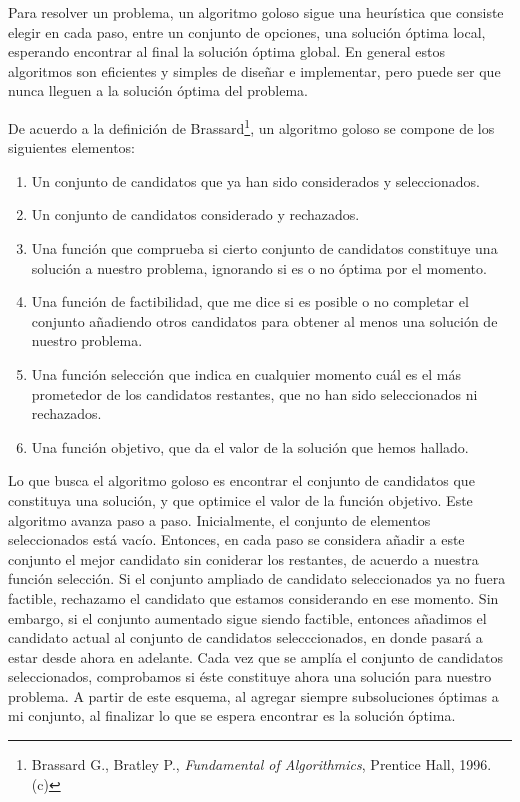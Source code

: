 
Para resolver un problema, un algoritmo goloso sigue una heur\'istica que consiste elegir en cada paso, entre un conjunto de opciones, una soluci\'on \'optima local, esperando encontrar al final la soluci\'on \'optima global. En general estos algoritmos son eficientes y simples de dise\~nar e implementar, pero puede ser que nunca lleguen a la soluci\'on \'optima del problema. 

De acuerdo a la definici\'on de Brassard\footnote{\label{Brassard}Brassard G., Bratley P., {\it Fundamental of Algorithmics}, Prentice Hall, 1996. (c)}, un algoritmo goloso se compone de los siguientes elementos: 

\begin{enumerate}
 \item Un conjunto de candidatos que ya han sido considerados y seleccionados. 
 \item Un conjunto de candidatos considerado y rechazados. 
 \item Una funci\'on que comprueba si cierto conjunto de candidatos constituye una soluci\'on a nuestro problema, ignorando si es o no \'optima por el momento. 
 \item Una funci\'on de factibilidad, que me dice si es posible o no completar el conjunto a\~nadiendo otros candidatos para obtener al menos una soluci\'on de nuestro problema. 
 \item Una funci\'on selecci\'on que indica en cualquier momento cu\'al es el m\'as prometedor de los candidatos restantes, que no han sido seleccionados ni rechazados. 
 \item Una funci\'on objetivo, que da el valor de la soluci\'on que hemos hallado. 
\end{enumerate}

Lo que busca el algoritmo goloso es encontrar el conjunto de candidatos que constituya una soluci\'on, y que optimice el valor de la funci\'on objetivo. Este algoritmo avanza paso a paso. Inicialmente, el conjunto de elementos seleccionados est\'a vac\'io. Entonces, en cada paso se considera a\~nadir a este conjunto el mejor candidato sin coniderar los restantes, de acuerdo a nuestra funci\'on selecci\'on. Si el conjunto ampliado de candidato seleccionados ya no fuera factible, rechazamo el candidato que estamos considerando en ese momento. Sin embargo, si el conjunto aumentado sigue siendo factible, entonces a\~nadimos el candidato actual al conjunto de candidatos selecccionados, en donde pasar\'a a estar desde ahora en adelante. Cada vez que se ampl\'ia el conjunto de candidatos seleccionados, comprobamos si \'este constituye ahora una soluci\'on para nuestro problema. A partir de este esquema, al agregar siempre subsoluciones \'optimas a mi conjunto, al finalizar lo que se espera encontrar es la soluci\'
on \'optima. 

